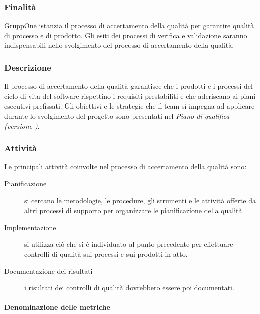 \documentclass[../../norme-di-progetto.tex]{subfiles}
\begin{document}
\subsubsection{Finalità}%
\label{subs:accertamento_della_qualita/finalita}

GruppOne istanzia il processo di accertamento della qualità per garantire qualità di processo e di prodotto.
Gli esiti dei processi di verifica e validazione saranno indispensabili nello svolgimento del processo di accertamento della qualità.

\subsubsection{Descrizione}%
\label{subs:accertamento_della_qualita/descrizione}

Il processo di accertamento della qualità garantisce che i prodotti e i processi del ciclo di vita del software rispettino i requisiti prestabiliti e che aderiscano ai piani esecutivi prefissati.
Gli obiettivi e le strategie che il team si impegna ad applicare durante lo svolgimento del progetto sono presentati nel \textit{Piano di qualifica (versione \versione)}.

\subsubsection{Attività}%
\label{subs:accertamento_della_qualita/attivita}

Le principali attività coinvolte nel processo di accertamento della qualità sono:

\begin{description}
  \item [Pianificazione] si cercano le metodologie, le procedure, gli strumenti e le attività offerte da altri processi di supporto per organizzare le pianificazione della qualità.
  \item [Implementazione] si utilizza ciò che si è individuato al punto precedente per effettuare controlli di qualità sui processi e sui prodotti in atto.
  \item [Documentazione dei risultati] i risultati dei controlli di qualità dovrebbero essere poi documentati.
\end{description}

\paragraph{Denominazione delle metriche}%
\label{par:denominazione_delle_metriche}
\end{document}
